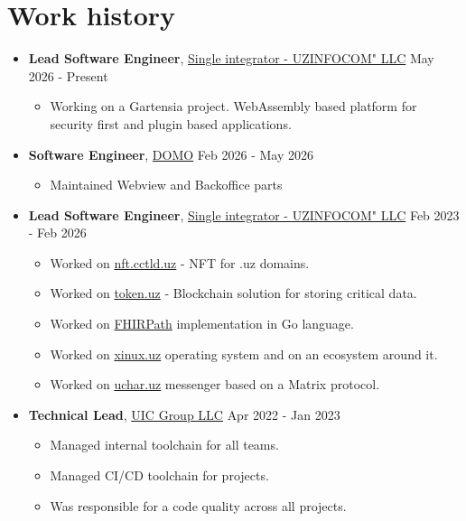 \documentclass[a4paper,10pt]{article}
\begin{document}
\section*{Work history}

\begin{itemize}[leftmargin=*]
  \item[] \textbf{Lead Software Engineer}, \href{https://www.linkedin.com/company/uzinfocom/}{Single integrator - UZINFOCOM" LLC} \hfill
    \small{May 2026 - Present}
  \begin{itemize} \setlength{\itemsep}{1pt} \setlength{\parskip}{1pt}
    \item Working on a Gartensia project. WebAssembly based platform for security first and plugin based applications.
  \end{itemize}

  \item[] \textbf{Software Engineer}, \href{https://www.linkedin.com/company/domo-uzbekistan/}{DOMO} \hfill
    \small{Feb 2026 - May 2026}
  \begin{itemize} \setlength{\itemsep}{1pt} \setlength{\parskip}{1pt}
    \item Maintained Webview and Backoffice parts
  \end{itemize}

  \item[] \textbf{Lead Software Engineer}, \href{https://www.linkedin.com/company/uzinfocom/}{Single integrator - UZINFOCOM" LLC} \hfill
    \small{Feb 2023 - Feb 2026}
  \begin{itemize} \setlength{\itemsep}{1pt} \setlength{\parskip}{1pt}
    \item Worked on \href{https://nft.cctld.uz}{nft.cctld.uz} - NFT for .uz domains.
    \item Worked on \href{https://token.uz}{token.uz} - Blockchain solution for storing critical data.
    \item Worked on \href{https://www.hl7.org/fhir/fhirpath.html}{FHIRPath} implementation in Go language.
    \item Worked on \href{https://xinux.uz}{xinux.uz} operating system and on an ecosystem around it.
    \item Worked on \href{https://uchar.uz}{uchar.uz} messenger based on a Matrix protocol.
  \end{itemize}


  \item[] \textbf{Technical Lead}, \href{https://www.linkedin.com/company/uic-group/}{UIC Group LLC} \hfill
  \small{Apr 2022 - Jan 2023}
  \begin{itemize} \setlength{\itemsep}{1pt} \setlength{\parskip}{1pt}
    \item Managed internal toolchain for all teams.
    \item Managed CI/CD toolchain for projects.
    \item Was responsible for a code quality across all projects.
  \end{itemize}


\end{itemize}
\end{document}
